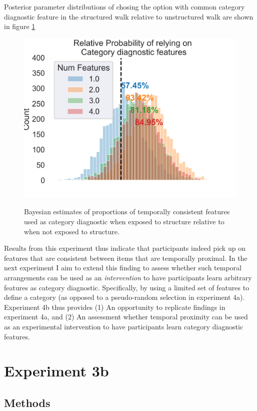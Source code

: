 Posterior parameter distributions of chosing the option with common category diagnostic feature in the structured walk relative to unstructured walk are shown in figure \ref{fig:exp4a-bayesmodel-choice-accuracy}
\begin{figure}[h]
    \centering
    \caption{Bayesian estimates of proportions of temporally consistent features used as category diagnostic when exposed to structure relative to when not exposed to structure.}
    \includegraphics[width = \textwidth]{chapter_notebooks/chapter_4/figures/exp4_bayesmodel_res.png}
    \label{fig:exp4a-bayesmodel-choice-accuracy}
\end{figure}

Results from this experiment thus indicate that participants indeed pick up on features that are consistent between items that are temporally proximal. In the next experiment I aim to extend this finding to assess whether such temporal arrangements can be used as an \textit{intervention} to have participants learn arbitrary features as category diagnostic. Specifically, by using a limited set of features to define a category (as opposed to a pseudo-random selection in experiment 4a). Experiment 4b thus provides (1) An opportunity to replicate findings in experiment 4a, and (2) An assessment whether temporal proximity can be used as an experimental intervention to have participants learn category diagnostic features. 

\section{Experiment 3b}
\subsection{Methods}
